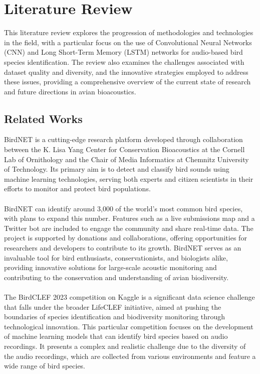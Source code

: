 \chapter{Literature Review}

This literature review explores the progression of methodologies and
technologies in the field, with a particular focus on the use of Convolutional
Neural Networks (CNN) and Long Short-Term Memory (LSTM) networks for
audio-based bird species identification. The review also examines the
challenges associated with dataset quality and diversity, and the innovative
strategies employed to address these issues, providing a comprehensive overview
of the current state of research and future directions in avian bioacoustics.

\section{Related Works}
BirdNET\cite{birdnet} is a cutting-edge research platform developed through collaboration
between the K. Lisa Yang Center for Conservation Bioacoustics at the Cornell
Lab of Ornithology and the Chair of Media Informatics at Chemnitz University of
Technology. Its primary aim is to detect and classify bird sounds using machine
learning technologies, serving both experts and citizen scientists in their
efforts to monitor and protect bird populations.\\\\ BirdNET can identify
around 3,000 of the world's most common bird species, with plans to expand this
number. Features such as a live submissions map and a Twitter bot are included
to engage the community and share real-time data. The project is supported by
donations and collaborations, offering opportunities for researchers and
developers to contribute to its growth. BirdNET serves as an invaluable tool
for bird enthusiasts, conservationists, and biologists alike, providing
innovative solutions for large-scale acoustic monitoring and contributing to
the conservation and understanding of avian biodiversity.\\\\ The BirdCLEF 2023
competition on Kaggle is a significant data science challenge that falls under
the broader LifeCLEF initiative, aimed at pushing the boundaries of species
identification and biodiversity monitoring through technological innovation.
This particular competition focuses on the development of machine learning
models that can identify bird species based on audio recordings. It presents a
complex and realistic challenge due to the diversity of the audio recordings,
which are collected from various environments and feature a wide range of bird
species.
